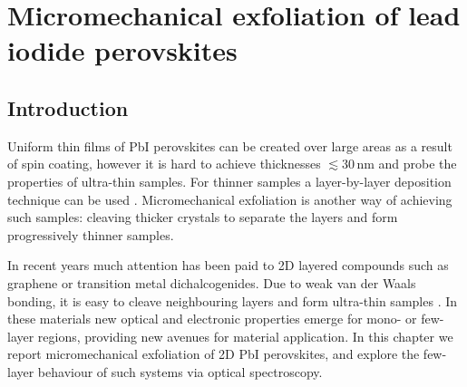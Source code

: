 
\chapter{Micromechanical exfoliation of lead iodide perovskites}

\graphicspath{{Chapter5/Figures/}}


\section{Introduction}
Uniform thin films of PbI perovskites can be created over large areas as a result of spin coating, however it is hard to achieve thicknesses $\lesssim30$\,nm and probe the properties of ultra-thin samples. For thinner samples a layer-by-layer deposition technique can be used \cite{Era2000, Matsui2002}. Micromechanical exfoliation is another way of achieving such samples: cleaving thicker crystals to separate the layers and form progressively thinner samples.

In recent years much attention has been paid to 2D layered compounds such as graphene or transition metal dichalcogenides. Due to weak van der Waals bonding, it is easy to cleave neighbouring layers and form ultra-thin samples \cite{Novoselov2004, Blake2007, Ni2007, Splendiani2010, Castellanos-Gomez2010, Tonndorf2013}. In these materials new optical and electronic properties emerge for mono- or few-layer regions, providing new avenues for material application. In this chapter we report micromechanical exfoliation of 2D PbI perovskites, and explore the few-layer behaviour of such systems via optical spectroscopy.

